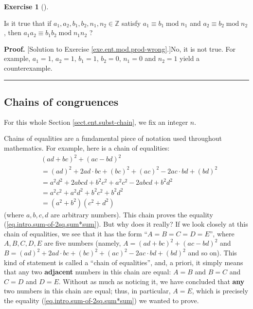 \documentclass[numbers=enddot,12pt,final,onecolumn,notitlepage]{scrartcl}%
\newcounter{exer}
\numberwithin{exer}{subsection}
\theoremstyle{definition}
\newtheorem{exmp}[exer]{Exercise}
\newenvironment{exercise}[1][]
{\begin{exmp}[#1]\begin{leftbar}}
{\end{leftbar}\end{exmp}}
\newenvironment{fineprint}{\begin{small}}{\end{small}}
\newenvironment{proof}[1][Proof]{\noindent\textbf{#1.} }{\ \rule{0.5em}{0.5em}}
\begin{document}
\begin{exercise}
\label{exe.ent.mod.prod-wrong}Is it true that if $a_{1},a_{2},b_{1}%
,b_{2},n_{1},n_{2}\in\mathbb{Z}$ satisfy $a_{1}\equiv b_{1}\operatorname{mod}%
n_{1}$ and $a_{2}\equiv b_{2}\operatorname{mod}n_{2}$, then $a_{1}a_{2}\equiv
b_{1}b_{2}\operatorname{mod}n_{1}n_{2}$ ?
\end{exercise}

\begin{fineprint}
\begin{proof}
[Solution to Exercise \ref{exe.ent.mod.prod-wrong}.]No, it is not true. For
example, $a_{1}=1$, $a_{2}=1$, $b_{1}=1$, $b_{2}=0$, $n_{1}=0$ and $n_{2}=1$
yield a counterexample.
\end{proof}
\end{fineprint}

\subsection{\label{sect.ent.subst-chain}Chains of congruences}

For this whole Section \ref{sect.ent.subst-chain}, we fix an integer $n$.

Chains of equalities are a fundamental piece of notation used throughout
mathematics. For example, here is a chain of equalities:%
\begin{align*}
&  \left(  ad+bc\right)  ^{2}+\left(  ac-bd\right)  ^{2}\\
&  =\left(  ad\right)  ^{2}+2ad\cdot bc+\left(  bc\right)  ^{2}+\left(
ac\right)  ^{2}-2ac\cdot bd+\left(  bd\right)  ^{2}\\
&  =a^{2}d^{2}+2abcd+b^{2}c^{2}+a^{2}c^{2}-2abcd+b^{2}d^{2}\\
&  =a^{2}c^{2}+a^{2}d^{2}+b^{2}c^{2}+b^{2}d^{2}\\
&  =\left(  a^{2}+b^{2}\right)  \left(  c^{2}+d^{2}\right)
\end{align*}
(where $a,b,c,d$ are arbitrary numbers). This chain proves the equality
(\ref{eq.intro.sum-of-2sq.sum*sum}). But why does it really? If we look
closely at this chain of equalities, we see that it has the form
\textquotedblleft$A=B=C=D=E$\textquotedblright, where $A,B,C,D,E$ are five
numbers (namely, $A=\left(  ad+bc\right)  ^{2}+\left(  ac-bd\right)  ^{2}$ and
$B=\left(  ad\right)  ^{2}+2ad\cdot bc+\left(  bc\right)  ^{2}+\left(
ac\right)  ^{2}-2ac\cdot bd+\left(  bd\right)  ^{2}$ and so on). This kind of
statement is called a \textquotedblleft chain of equalities\textquotedblright,
and, a priori, it simply means that any two \textbf{adjacent} numbers in this
chain are equal: $A=B$ and $B=C$ and $C=D$ and $D=E$. Without as much as
noticing it, we have concluded that \textbf{any} two numbers in this chain are
equal; thus, in particular, $A=E$, which is precisely the equality
(\ref{eq.intro.sum-of-2sq.sum*sum}) we wanted to prove.
\end{document}
